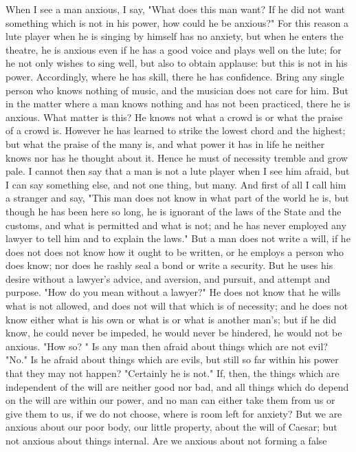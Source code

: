 \documentclass[a4paper]{article}
\begin{document}
    When I see a man anxious, I say, "What does this man want? If he did not
want something which is not in his power, how could he be anxious?" For this
reason a lute player when he is singing by himself has no anxiety, but when he
enters the theatre, he is anxious even if he has a good voice and plays well on
the lute; for he not only wishes to sing well, but also to obtain applause: but
this is not in his power. Accordingly, where he has skill, there he has
confidence. Bring any single person who knows nothing of music, and the
musician does not care for him. But in the matter where a man knows nothing and
has not been practiced, there he is anxious. What matter is this? He knows not
what a crowd is or what the praise of a crowd is. However he has learned to
strike the lowest chord and the highest; but what the praise of the many is,
and what power it has in life he neither knows nor has he thought about it.
Hence he must of necessity tremble and grow pale. I cannot then say that a man
is not a lute player when I see him afraid, but I can say something else, and
not one thing, but many. And first of all I call him a stranger and say, "This
man does not know in what part of the world he is, but though he has been here
so long, he is ignorant of the laws of the State and the customs, and what is
permitted and what is not; and he has never employed any lawyer to tell him and
to explain the laws." But a man does not write a will, if he does not does not
know how it ought to be written, or he employs a person who does know; nor does
he rashly seal a bond or write a security. But he uses his desire without a
lawyer's advice, and aversion, and pursuit, and attempt and purpose. "How do
you mean without a lawyer?" He does not know that he wills what is not allowed,
and does not will that which is of necessity; and he does not know either what
is his own or what is or what is another man's; but if he did know, he could
never be impeded, he would never be hindered, he would not be anxious. "How so?
" Is any man then afraid about things which are not evil? "No." Is he afraid
about things which are evils, but still so far within his power that they may
not happen? "Certainly he is not." If, then, the things which are independent
of the will are neither good nor bad, and all things which do depend on the
will are within our power, and no man can either take them from us or give them
to us, if we do not choose, where is room left for anxiety? But we are anxious
about our poor body, our little property, about the will of Caesar; but not
anxious about things internal. Are we anxious about not forming a false
\end{document}
